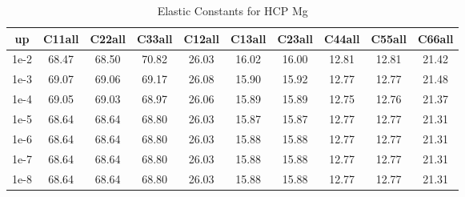 \begin{table}[h!]
\centering
\begin{tabular}{|c|c|c|c|c|c|c|c|c|c|}
\hline
up & C11all & C22all & C33all & C12all & C13all & C23all & C44all & C55all & C66all \\
\hline
1e-2 & 68.47 & 68.50 & 70.82 & 26.03 & 16.02 & 16.00 & 12.81 & 12.81 & 21.42 \\
\hline
1e-3 & 69.07 & 69.06 & 69.17 & 26.08 & 15.90 & 15.92 & 12.77 & 12.77 & 21.48 \\
\hline
1e-4 & 69.05 & 69.03 & 68.97 & 26.06 & 15.89 & 15.89 & 12.75 & 12.76 & 21.37 \\
\hline
1e-5 & 68.64 & 68.64 & 68.80 & 26.03 & 15.87 & 15.87 & 12.77 & 12.77 & 21.31 \\
\hline
1e-6 & 68.64 & 68.64 & 68.80 & 26.03 & 15.88 & 15.88 & 12.77 & 12.77 & 21.31 \\
\hline
1e-7 & 68.64 & 68.64 & 68.80 & 26.03 & 15.88 & 15.88 & 12.77 & 12.77 & 21.31 \\
\hline
1e-8 & 68.64 & 68.64 & 68.80 & 26.03 & 15.88 & 15.88 & 12.77 & 12.77 & 21.31 \\
\hline
\end{tabular}
\caption{Elastic Constants for HCP Mg}
\label{tab:elastic_constants}
\end{table}
